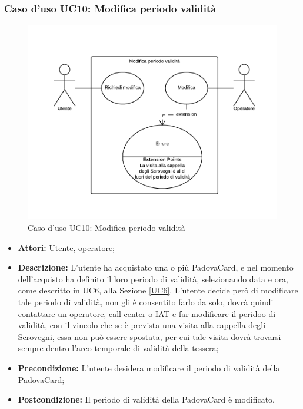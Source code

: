 \subsubsection{Caso d'uso UC10: Modifica periodo validità}
\begin{figure}[H]
\centering
\includegraphics[width=1\textwidth]{images/UC10.png}
\caption{Caso d'uso UC10: Modifica periodo validità}
\end{figure}
\begin{itemize}
\item \textbf{Attori:} Utente, operatore;
\item \textbf{Descrizione:} L'utente ha acquistato una o più PadovaCard, e nel momento dell'acquisto ha definito il loro periodo di validità, selezionando data e ora, come descritto in UC6, alla Sezione \ref{UC6}. L'utente decide però di modificare tale periodo di validità, non gli è consentito farlo da solo, dovrà quindi contattare un operatore, call center o IAT e far modificare il peridoo di validità, con il vincolo che se è prevista una visita alla cappella degli Scrovegni, essa non può essere spostata, per cui tale visita dovrà trovarsi sempre dentro l'arco temporale di validità della tessera;
\item \textbf{Precondizione:} L'utente desidera modificare il periodo di validità della PadovaCard;
\item \textbf{Postcondizione:}  Il periodo di validità della PadovaCard è modificato.
\end{itemize}

